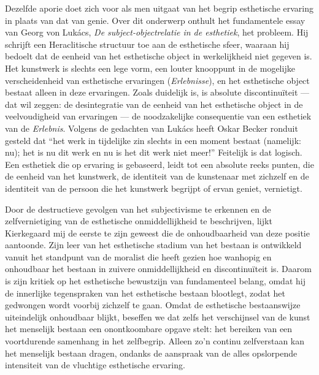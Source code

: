 Dezelfde aporie doet zich voor als men uitgaat van het begrip esthetische ervaring in plaats van dat van genie. Over dit onderwerp onthult het fundamentele essay van Georg von Lukács, \textit{De subject-objectrelatie in de esthetiek}, het probleem. Hij schrijft een Heraclitische structuur toe aan de esthetische sfeer, waaraan hij bedoelt dat de eenheid van het esthetische object in werkelijkheid niet gegeven is. Het kunstwerk is slechts een lege vorm, een louter knooppunt in de mogelijke verscheidenheid van esthetische ervaringen (\textit{Erlebnisse}), en het esthetische object bestaat alleen in deze ervaringen. Zoals duidelijk is, is absolute discontinuïteit — dat wil zeggen: de desintegratie van de eenheid van het esthetische object in de veelvoudigheid van ervaringen — de noodzakelijke consequentie van een esthetiek van de \textit{Erlebnis}. Volgens de gedachten van Lukács heeft Oskar Becker ronduit gesteld dat ``het werk in tijdelijke zin slechts in een moment bestaat (namelijk: nu); het is nu dit werk en nu is het dit werk niet meer!'' Feitelijk is dat logisch. Een esthetiek die op ervaring is gebaseerd, leidt tot een absolute reeks punten, die de eenheid van het kunstwerk, de identiteit van de kunstenaar met zichzelf en de identiteit van de persoon die het kunstwerk begrijpt of ervan geniet, vernietigt.

Door de destructieve gevolgen van het subjectivisme te erkennen en de zelfvernietiging van de esthetische onmiddellijkheid te beschrijven, lijkt Kierkegaard mij de eerste te zijn geweest die de onhoudbaarheid van deze positie aantoonde. Zijn leer van het esthetische stadium van het bestaan is ontwikkeld vanuit het standpunt van de moralist die heeft gezien hoe wanhopig en onhoudbaar het bestaan in zuivere onmiddellijkheid en discontinuïteit is. Daarom is zijn kritiek op het esthetische bewustzijn van fundamenteel belang, omdat hij de innerlijke tegenspraken van het esthetische bestaan blootlegt, zodat het gedwongen wordt voorbij zichzelf te gaan. Omdat de esthetische bestaanswijze uiteindelijk onhoudbaar blijkt, beseffen we dat zelfs het verschijnsel van de kunst het menselijk bestaan een onontkoombare opgave stelt: het bereiken van een voortdurende samenhang in het zelfbegrip. Alleen zo’n continu zelfverstaan kan het menselijk bestaan dragen, ondanks de aanspraak van de alles opslorpende intensiteit van de vluchtige esthetische ervaring.

